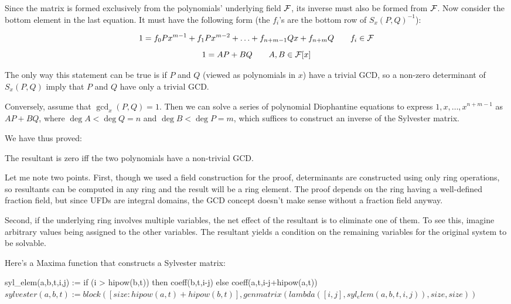 Since the matrix is formed exclusively from the polynomials'
underlying field ${\cal F}$, its inverse must also be formed from
${\cal F}$.  Now consider the bottom element in the last equation.  It
must have the following form (the $f_i$'s are the bottom row of
$S_x(P,Q)^{-1}$):

$$ 1 = f_0 P x^{m-1} + f_1 P x^{m-2} + \ldots + f_{n+m-1} Q x + f_{n+m} Q \qquad f_i \in {\cal F}$$
$$ 1 = A P + B Q \qquad A,B \in {\cal F}[x] $$

The only way this statement can be true is if $P$ and $Q$ (viewed
as polynomials in $x$) have a
trivial GCD, so a non-zero determinant of $S_x(P,Q)$ imply that $P$ and
$Q$ have only a trivial GCD.

Conversely, assume that $\gcd_x(P,Q) = 1$.  Then we can solve a series
of polynomial Diophantine equations to express $1, x, \ldots,
x^{n+m-1}$ as $AP+BQ$, where $\deg A < \deg Q = n$ and $\deg B <
\deg P = m$, which suffices to construct an inverse of the Sylvester
matrix.

We have thus proved:

\begin{theorem}\label{resultant theorem}
The resultant is zero iff the two polynomials have a non-trivial GCD.
\end{theorem}

Let me note two points.  First, though we used a field construction
for the proof, determinants are constructed using only ring
operations, so resultants can be computed in any ring and the result
will be a ring element.  The proof depends on the ring having a
well-defined fraction field, but since UFDs are integral domains, the
GCD concept doesn't make sense without a fraction field anyway.

Second, if the underlying ring involves multiple variables, the net
effect of the resultant is to eliminate one of them.  To see this,
imagine arbitrary values being assigned to the other variables.  The
resultant yields a condition on the remaining variables for the
original system to be solvable.


\vfill\eject

Here's a Maxima function that constructs a Sylvester matrix:

\begin{maximablock}
syl_elem(a,b,t,i,j) :=
   if (i > hipow(b,t))
      then coeff(b,t,i-j)
      else coeff(a,t,i-j+hipow(a,t))$
sylvester(a,b,t) := block(
   [size: hipow(a,t) + hipow(b,t)],
   genmatrix(lambda([i,j], syl_elem(a,b,t,i,j)),
             size, size)
)$
\end{maximablock}

